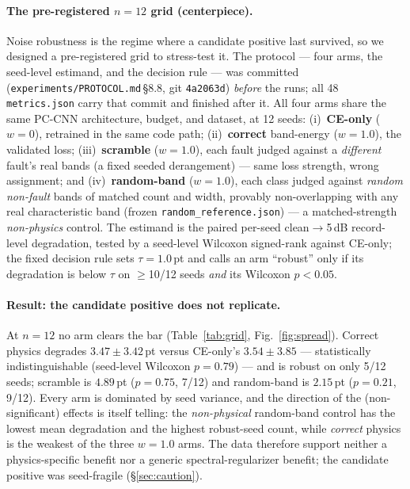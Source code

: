 \documentclass{article}
\begin{document}
\paragraph{The pre-registered $n{=}12$ grid (centerpiece).}
Noise robustness is the regime where a candidate positive last survived, so we
designed a pre-registered grid to stress-test it. The protocol --- four arms,
the seed-level estimand, and the decision rule --- was committed
(\texttt{experiments/PROTOCOL.md}\,\S8.8, git \texttt{4a2063d})
\emph{before} the runs; all 48 \texttt{metrics.json} carry that commit and
finished after it. All four arms share the same PC-CNN architecture, budget, and
dataset, at 12 seeds: (i)~\textbf{CE-only} ($w{=}0$), retrained in the same code
path; (ii)~\textbf{correct} band-energy ($w{=}1.0$), the validated loss;
(iii)~\textbf{scramble} ($w{=}1.0$), each fault judged against a \emph{different}
fault's real bands (a fixed seeded derangement) --- same loss strength, wrong
assignment; and (iv)~\textbf{random-band} ($w{=}1.0$), each class judged against
\emph{random non-fault} bands of matched count and width, provably
non-overlapping with any real characteristic band (frozen
\texttt{random\_reference.json}) --- a matched-strength \emph{non-physics}
control. The estimand is the paired per-seed clean$\rightarrow$5\,dB
record-level degradation, tested by a seed-level Wilcoxon signed-rank against
CE-only; the fixed decision rule sets $\tau=1.0$\,pt and calls an arm
``robust'' only if its degradation is below $\tau$ on $\ge$10/12 seeds
\emph{and} its Wilcoxon $p<0.05$.



\paragraph{Result: the candidate positive does not replicate.}
At $n{=}12$ no arm clears the bar (Table~\ref{tab:grid},
Fig.~\ref{fig:spread}). Correct physics degrades $3.47\pm3.42$\,pt versus
CE-only's $3.54\pm3.85$ --- statistically indistinguishable (seed-level Wilcoxon
$p=0.79$) --- and is robust on only 5/12 seeds; scramble is $4.89$\,pt
($p=0.75$, 7/12) and random-band is $2.15$\,pt ($p=0.21$, 9/12). Every arm is
dominated by seed variance, and the direction of the (non-significant) effects
is itself telling: the \emph{non-physical} random-band control has the lowest
mean degradation and the highest robust-seed count, while \emph{correct} physics
is the weakest of the three $w{=}1.0$ arms. The data therefore support neither a
physics-specific benefit nor a generic spectral-regularizer benefit; the
candidate positive was seed-fragile (\S\ref{sec:caution}).
\end{document}
